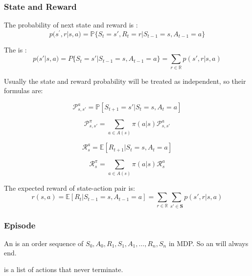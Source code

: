 \subsubsection{State and Reward}

The probability of next state and reward is :
\begin{equation}
	p(s^\prime,r|s,a) = \mathbb{P}\{S_t=s',R_t=r|S_{t-1}=s,A_{t-1}=a\}
\end{equation}

The  is :
\begin{equation}
	p(s'|s,a)=P\{S_t=s'|S_{t-1}=s,A_{t-1} = a \}=\sum_{r \in \mathbb{R}} p(s',r|s,a)
\end{equation}





Usually the state and reward probability will be treated as independent, so their formulas are:

\begin{equation}
	\mathcal{P}_{s,s'}^a = \mathbb{P}[S_{t+1}=s' | S_t = s, A_t = a]
\end{equation}


\begin{equation}
	\mathcal{P}_{s,s'}^{\pi} = \sum_{a \in A(s)} \pi(a|s) \mathcal{P}_{s,s'}^a
\end{equation}


\begin{equation}
	\mathcal{R}_s^a = \mathbb{E}[R_{t+1}|S_t =s, A_t=a]
\end{equation}


\begin{equation}
	\mathcal{R}_s^\pi = \sum_{a \in A(s)} \pi(a|s) \mathcal{R}_s^a
\end{equation}



The expected reward of state-action pair is:
\begin{equation}
	r(s,a) = \mathbb{E}[R_t|S_{t-1}=s,A_{t-1}=a]= \sum_{r \in \mathbb{R}} \sum_{s' \in \mathbf{S}} p(s',r|s,a)
\end{equation}

\subsubsection{Episode}
An  is an order sequence of $S_0, A_0,R_1,S_1,A_1, \dots, R_n, S_n$ in MDP. So an  will always end.

 is a list of actions that never terminate.

